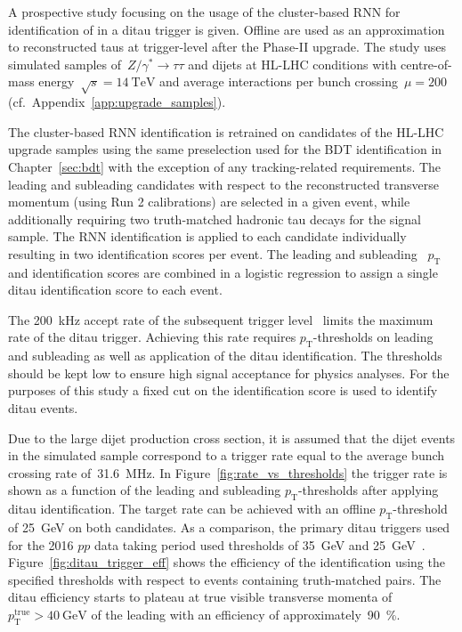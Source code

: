 A prospective study focusing on the usage of the cluster-based RNN for
identification of \tauhadvis in a ditau trigger is given. Offline \tauhadvis are
used as an approximation to reconstructed taus at trigger-level after the
Phase-II upgrade. The study uses simulated samples
of~$Z / \gamma^* \to \tau \tau$ and dijets at HL-LHC conditions with
centre-of-mass energy~$\sqrt{s}=\SI{14}{\TeV}$ and average interactions per
bunch crossing~$\mu = 200$ (cf.\ Appendix~\ref{app:upgrade_samples}).

The cluster-based RNN identification is retrained on \tauhadvis candidates of
the HL-LHC upgrade samples using the same preselection used for the BDT
identification in Chapter~\ref{sec:bdt} with the exception of any
tracking-related requirements. The leading and subleading \tauhadvis candidates
with respect to the reconstructed transverse momentum (using Run 2 calibrations)
are selected in a given event, while additionally requiring two truth-matched
hadronic tau decays for the signal sample. The RNN identification is applied to
each \tauhadvis candidate individually resulting in two identification scores
per event. The leading and subleading \tauhadvis~$p_\text{T}$ and identification
scores are combined in a logistic regression to assign a single ditau
identification score to each event.

The \SI{200}{\kilo\hertz} accept rate of the subsequent trigger
level~\cite{phase_2_scoping} limits the maximum rate of the ditau trigger.
Achieving this rate requires $p_\text{T}$-thresholds on leading and subleading
\tauhadvis as well as application of the ditau identification. The thresholds
should be kept low to ensure high signal acceptance for physics analyses. For
the purposes of this study a fixed cut on the identification score  is used to identify ditau events.

Due to the large dijet production cross section, it is assumed that the dijet
events in the simulated sample correspond to a trigger rate equal to the average
bunch crossing rate of~\SI{31.6}{\mega\hertz}. In
Figure~\ref{fig:rate_vs_thresholds} the trigger rate is shown as a function of
the leading and subleading \tauhadvis $p_\text{T}$-thresholds after applying
ditau identification. The target rate can be achieved with an offline
$p_\text{T}$-threshold of \SI{25}{\GeV} on both \tauhadvis candidates. As a
comparison, the primary ditau triggers used for the 2016 $pp$ data taking period
used thresholds of \SI{35}{\GeV} and \SI{25}{\GeV}~\cite{tautrigger_run2}.
Figure~\ref{fig:ditau_trigger_eff}  shows the
efficiency of the identification using the specified thresholds with respect to
events containing truth-matched \tauhadvis pairs. The ditau efficiency starts to
plateau at true visible transverse momenta
of~$p_\text{T}^\text{true} > \SI{40}{\GeV}$ of the leading \tauhadvis with an
efficiency of approximately~\SI{90}{\percent}.

